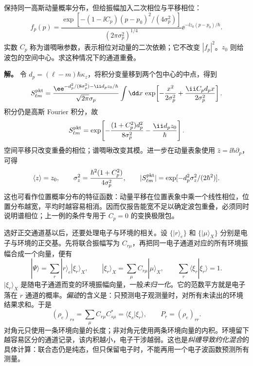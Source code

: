 \begin{exbox}[能谱相同的啁啾波包为何有不同重叠]
保持同一高斯动量概率分布，但给振幅加入二次相位与平移相位：
\begin{equation*}
 f_p(p)=\frac{\exp[-(1-\ii C_p)(p-p_0)^2/(4\sigma_p^2)]}
 {(2\pi\sigma_p^2)^{1/4}}
 \ee^{-\ii z_0(p-p_0)/\hbar}.
\end{equation*}
实数 $C_p$ 称为谱啁啾参数，表示相位对动量的二次依赖；它不改变 $|f_p|^2$。$z_0$ 则给波包的空间中心。求这种情况下的通道重叠。

\textbf{解。} 令 $d_p=(\ell-m)\hbar\kappa_z$，将积分变量移到两个包中心的中点，得到
\begin{equation*}
 S_{\ell m}^{\rm pkt}
 =\frac{\ee^{-d_p^2/(8\sigma_p^2)-\ii d_pz_0/\hbar}}
 {\sqrt{2\pi}\sigma_p}
 \int\dd x\,\exp\!\left[-\frac{x^2}{2\sigma_p^2}
             +\frac{\ii C_pd_px}{2\sigma_p^2}\right].
\end{equation*}
积分仍是高斯 Fourier 积分，故
\begin{equation*}
 S_{\ell m}^{\rm pkt}
 =\exp\!\left[-\frac{(1+C_p^2)d_p^2}{8\sigma_p^2}
               -\frac{\ii d_pz_0}{\hbar}\right].
\end{equation*}
空间平移只改变重叠的相位；谱啁啾改变其模。进一步在动量表象使用 $\hat z=\ii\hbar\partial_p$，可得
\begin{equation*}
 \langle z\rangle=z_0,\qquad
 \sigma_z^2=\frac{\hbar^2(1+C_p^2)}{4\sigma_p^2},\qquad
 |S_{\ell m}^{\rm pkt}|=\exp[-d_p^2\sigma_z^2/(2\hbar^2)].
\end{equation*}
这也可看作位置概率分布的特征函数：动量平移在位置表象中乘一个线性相位，位置分布越宽，平均时越容易相消。因而仅报告能宽不足以确定波包重叠，必须同时说明谱相位；上一例的条件专用于 $C_p=0$ 的变换极限包。
\end{exbox}

选好正交通道基以后，还要处理电子与环境的相关。设 $\{|r\rangle_e\}$ 和 $\{|\mu\rangle_X\}$ 分别是电子与环境的正交基。先将联合振幅写为 $C_{r\mu}$，再把同一电子通道对应的所有环境振幅合成一个向量，便有
\begin{equation}
 |\Psi\rangle=\sum_r|r\rangle_e|\xi_r\rangle_X,\qquad
 |\xi_r\rangle_X=\sum_\mu C_{r\mu}|\mu\rangle_X,
 \qquad \sum_r\langle\xi_r|\xi_r\rangle=1.
 \label{eq:electron-environment-conditional-vectors}
\end{equation}
$|\xi_r\rangle_X$ 是随电子通道而变的环境振幅向量，一般\emph{未归一化}。它的范数平方就是电子落在 $r$ 通道的概率。\emph{偏迹}的含义是：只预测电子观测量时，对所有未读出的环境结果求和。于是
\begin{equation}
 (\rho_e)_{rs}=\sum_\mu C_{r\mu}C_{s\mu}^*
 =\langle\xi_s|\xi_r\rangle,
 \qquad P_r=(\rho_e)_{rr}.
 \label{eq:electron-coherence-environment-overlap}
\end{equation}
对角元只使用一条环境向量的长度；非对角元使用两条环境向量的内积。环境留下越容易区分的通道记录，该内积越小，电子干涉越弱。这也是\emph{纠缠导致约化混合}的具体计算：联合态仍是纯态，但只保留电子时，不能再用一个电子波函数预测所有测量。

